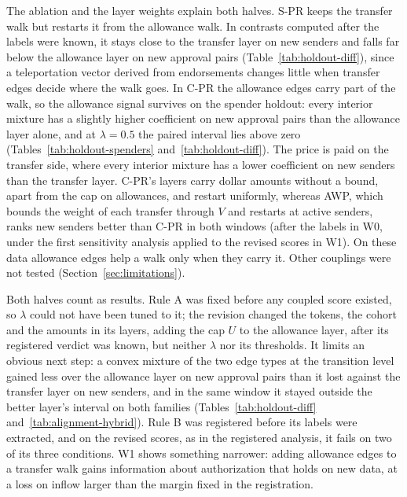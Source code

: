 The ablation and the layer weights explain both halves. S-PR keeps the transfer walk but restarts it from the allowance walk. In contrasts computed after the labels were known, it stays close to the transfer layer on new senders and falls far below the allowance layer on new approval pairs (Table~\ref{tab:holdout-diff}), since a teleportation vector derived from endorsements changes little when transfer edges decide where the walk goes. In C-PR the allowance edges carry part of the walk, so the allowance signal survives on the spender holdout: every interior mixture has a slightly higher coefficient on new approval pairs than the allowance layer alone, and at $\lambda=0.5$ the paired interval lies above zero (Tables~\ref{tab:holdout-spenders} and~\ref{tab:holdout-diff}). The price is paid on the transfer side, where every interior mixture has a lower coefficient on new senders than the transfer layer. C-PR's layers carry dollar amounts without a bound, apart from the cap on allowances, and restart uniformly, whereas AWP, which bounds the weight of each transfer through $V$ and restarts at active senders, ranks new senders better than C-PR in both windows (after the labels in W0, under the first sensitivity analysis applied to the revised scores in W1). On these data allowance edges help a walk only when they carry it. Other couplings were not tested (Section~\ref{sec:limitations}).

Both halves count as results. Rule A was fixed before any coupled score existed, so $\lambda$ could not have been tuned to it; the revision changed the tokens, the cohort and the amounts in its layers, adding the cap $U$ to the allowance layer, after its registered verdict was known, but neither $\lambda$ nor its thresholds. It limits an obvious next step: a convex mixture of the two edge types at the transition level gained less over the allowance layer on new approval pairs than it lost against the transfer layer on new senders, and in the same window it stayed outside the better layer's interval on both families (Tables~\ref{tab:holdout-diff} and~\ref{tab:alignment-hybrid}). Rule B was registered before its labels were extracted, and on the revised scores, as in the registered analysis, it fails on two of its three conditions. W1 shows something narrower: adding allowance edges to a transfer walk gains information about authorization that holds on new data, at a loss on inflow larger than the margin fixed in the registration.


